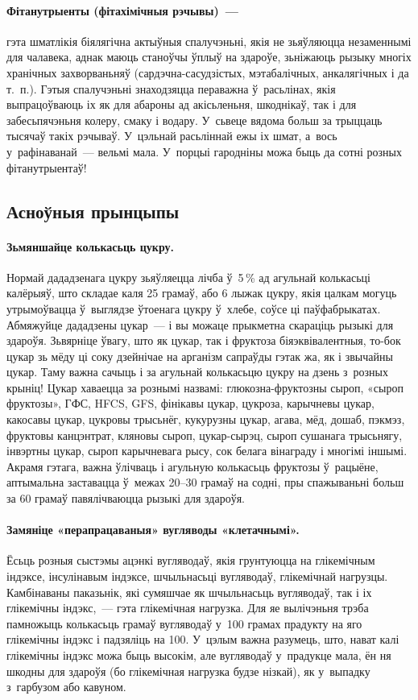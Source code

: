 \paragraph{Фітанутрыенты (фітахімічныя рэчывы)~---} гэта шматлікія біялягічна актыўныя спалучэньні, якія не зьяўляюцца незаменнымі для чалавека, аднак маюць станоўчы ўплыў на здароўе, зьніжаюць рызыку многіх хранічных захворваньняў (сардэчна-сасудзістых, мэтабалічных, анкалягічных і да т.~п.). Гэтыя спалучэньні знаходзяцца пераважна ў~расьлінах, якія выпрацоўваюць іх як для абароны ад акісьленьня, шкоднікаў, так і для забесьпячэньня колеру, смаку і водару. У~сьвеце вядома больш за трыццаць тысячаў такіх рэчываў. У~цэльнай расьліннай ежы іх шмат, а~вось у~рафінаванай~--- вельмі мала. У~порцыі гародніны можа быць да сотні розных фітанутрыентаў!

\subsection{Асноўныя прынцыпы}

\paragraph{Зьмяншайце колькасьць цукру.}
Нормай дададзенага цукру зьяўляецца лічба ў~5\,\% ад агульнай колькасьці калёрыяў, што складае каля 25 грамаў, або 6 лыжак цукру, якія цалкам могуць утрымоўвацца ў~выглядзе ўтоенага цукру ў~хлебе, соўсе ці паўфабрыкатах. Абмяжуйце дададзены цукар~--- і вы можаце прыкметна скараціць рызыкі для здароўя. Зьвярніце ўвагу, што як цукар, так і фруктоза біяэквівалентныя, то-бок цукар зь мёду ці соку дзейнічае на арганізм сапраўды гэтак жа, як і звычайны цукар. Таму важна сачыць і за агульнай колькасьцю цукру на дзень з~розных крыніц! Цукар хаваецца за рознымі назвамі: глюкозна-фруктозны сыроп, «сыроп фруктозы», ГФС, HFCS, GFS, фінікавы цукар, цукроза, карычневы цукар, какосавы цукар, цукровы трысьнёг, кукурузны цукар, агава, мёд, дошаб, пэкмэз, фруктовы канцэнтрат, кляновы сыроп, цукар-сырэц, сыроп сушанага трысьнягу, інвэртны цукар, сыроп карычневага рысу, сок белага вінаграду і многімі іншымі. Акрамя гэтага, важна ўлічваць і агульную колькасьць фруктозы ў~рацыёне, аптымальна заставацца ў~межах 20--30 грамаў на содні, пры спажываньні больш за 60 грамаў павялічваюцца рызыкі для здароўя.

\paragraph{Замяніце «перапрацаваныя» вугляводы «клетачнымі».}
Ёсьць розныя сыстэмы ацэнкі вугляводаў, якія грунтуюцца на глікемічным індэксе, інсулінавым індэксе, шчыльнасьці вугляводаў, глікемічнай нагрузцы. Камбінаваны паказьнік, які сумяшчае як шчыльнасьць вугляводаў, так і іх глікемічны індэкс,~--- гэта глікемічная нагрузка. Для яе вылічэньня трэба памножыць колькасьць грамаў вугляводаў у~100 грамах прадукту на яго глікемічны індэкс і падзяліць на 100. У~цэлым важна разумець, што, нават калі глікемічны індэкс можа быць высокім, але вугляводаў у~прадукце мала, ён ня шкодны для здароўя (бо глікемічная нагрузка будзе нізкай), як у~выпадку з~гарбузом або кавуном.

